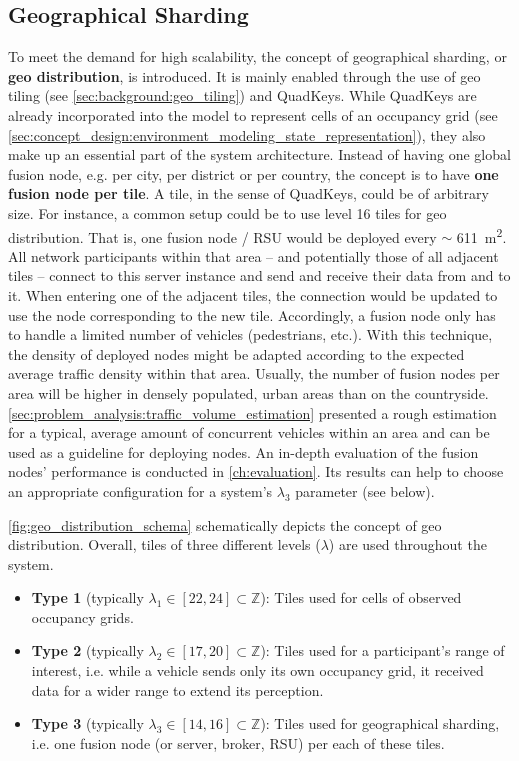 \subsection{Geographical Sharding}
\label{subsec:conept_design:geographical_sharding}
To meet the demand for high scalability, the concept of geographical sharding, or \textbf{geo distribution}, is introduced. It is mainly enabled through the use of geo tiling (see \autoref{sec:background:geo_tiling}) and QuadKeys. While QuadKeys are already incorporated into the model to represent cells of an occupancy grid (see \autoref{sec:concept_design:environment_modeling_state_representation}), they also make up an essential part of the system architecture. Instead of having one global fusion node, e.g. per city, per district or per country, the concept is to have \textbf{one fusion node per tile}. A tile, in the sense of QuadKeys, could be of arbitrary size. For instance, a common setup could be to use level 16 tiles for geo distribution. That is, one fusion node / RSU would be deployed every $\sim$ \SI{611}{\square\meter}. All network participants within that area – and potentially those of all adjacent tiles – connect to this server instance and send and receive their data from and to it. When entering one of the adjacent tiles, the connection would be updated to use the node corresponding to the new tile. Accordingly, a fusion node only has to handle a limited number of vehicles (pedestrians, etc.). With this technique, the density of deployed nodes might be adapted according to the expected average traffic density within that area. Usually, the number of fusion nodes per area will be higher in densely populated, urban areas than on the countryside. \autoref{sec:problem_analysis:traffic_volume_estimation} presented a rough estimation for a typical, average amount of concurrent vehicles within an area and can be used as a guideline for deploying nodes. An in-depth evaluation of the fusion nodes' performance is conducted in \autoref{ch:evaluation}. Its results can help to choose an appropriate configuration for a system's $\lambda_3$ parameter (see below).
\par
\bigskip

\autoref{fig:geo_distribution_schema} schematically depicts the concept of geo distribution. Overall, tiles of three different levels ($\lambda$) are used throughout the system.

\begin{itemize}
	\item \textbf{Type 1} (typically $\lambda_1 \in [22, 24] \subset \mathbb{Z}$): Tiles used for cells of observed occupancy grids.
	\item \textbf{Type 2} (typically $\lambda_2 \in [17, 20] \subset \mathbb{Z}$): Tiles used for a participant's range of interest, i.e. while a vehicle sends only its own occupancy grid, it received data for a wider range to extend its perception.
	\item \textbf{Type 3} (typically $\lambda_3 \in [14, 16] \subset \mathbb{Z}$): Tiles used for geographical sharding, i.e. one fusion node (or server, broker, RSU) per each of these tiles.
\end{itemize}

